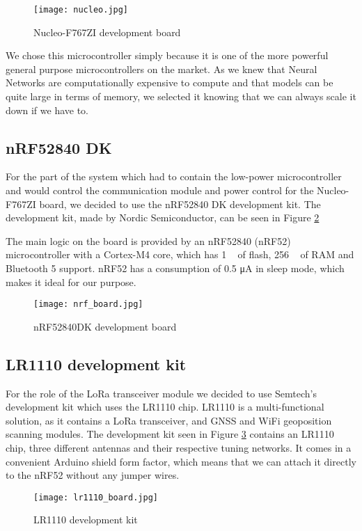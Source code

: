 \begin{figure}[ht]
        \centering
        \texttt{[image: nucleo.jpg]} 
        \caption{ Nucleo-F767ZI development board} 
        \label{nucleo}
\end{figure}

We chose this microcontroller simply because it is one of the more powerful general purpose microcontrollers on the market.
As we knew that Neural Networks are computationally expensive to compute and that models can be quite large in terms of memory, we selected it knowing that we can always scale it down if we have to.


\subsection{ nRF52840 DK}

For the part of the system which had to contain the low-power microcontroller and would control the communication module and power control for the Nucleo-F767ZI board, we decided to use the nRF52840 DK development kit.
The development kit, made by Nordic Semiconductor, can be seen in Figure \ref{nrf_board}

The main logic on the board is provided by an nRF52840 (nRF52) microcontroller with a Cortex-M4 core, which has 1 \si{\mega\byte} of flash, 256 \si{\kilo\byte} of RAM and Bluetooth 5 support.
nRF52 has a consumption of 0.5 \si{\micro\ampere} in sleep mode, which makes it ideal for our purpose.
\newline
\begin{figure}[ht]
        \centering
        \texttt{[image: nrf\_board.jpg]} 
        \caption{ nRF52840DK development board}
        \label{nrf_board}
\end{figure}

\subsection{ LR1110 development kit}

For the role of the LoRa transceiver module we decided to use Semtech's development kit which uses the LR1110 chip.
LR1110 is a multi-functional solution, as it contains a LoRa transceiver, and GNSS and WiFi geoposition scanning modules.
The development kit seen in Figure \ref{lr1110_board} contains an LR1110 chip, three different antennas and their respective tuning networks.
It comes in a convenient Arduino shield form factor, which means that we can attach it directly to the nRF52 without any jumper wires.
\begin{figure}[ht]
        \centering
        \texttt{[image: lr1110\_board.jpg]} 
        \caption{ LR1110 development kit}
        \label{lr1110_board}
\end{figure}

